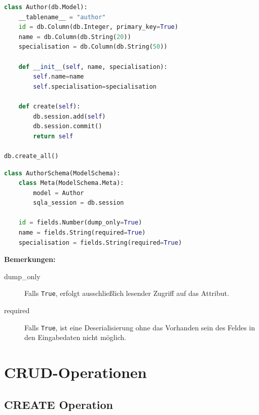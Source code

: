 \documentclass[a4paper,titlepage,halfparskip,12pt,listof=numbered]{scrreprt}
\begin{document}
\begin{lstlisting}[language=python,caption={Definition des Schemas für das SQLAlchemy Modul}, label={lst:tableSchemaAuthor}]
class Author(db.Model):
    __tablename__ = "author"
    id = db.Column(db.Integer, primary_key=True)
    name = db.Column(db.String(20))
    specialisation = db.Column(db.String(50))

    def __init__(self, name, specialisation):
        self.name=name
        self.specialisation=specialisation

    def create(self):
        db.session.add(self)
        db.session.commit()
        return self

db.create_all()

\end{lstlisting}

\bigskip

\begin{lstlisting}[language=python,caption={Definition des Schemas für das marshmallow Modul}, label={lst:marshmallowSchema}]
class AuthorSchema(ModelSchema):
    class Meta(ModelSchema.Meta):
        model = Author
        sqla_session = db.session

    id = fields.Number(dump_only=True)
    name = fields.String(required=True)
    specialisation = fields.String(required=True)
\end{lstlisting}

\textbf{Bemerkungen:}

\bigskip

\begin{description}
\item[dump\_only] Falls \texttt{True}, erfolgt ausschließlich lesender Zugriff auf das Attribut.\cite{marshmallowQuickstart}
\item[required] Falls \texttt{True}, ist eine Deserialisierung ohne das Vorhanden sein des Feldes in den Eingabedaten nicht möglich.\cite{marshmallowQuickstart}
\end{description}

\chapter{CRUD-Operationen}

\section{CREATE Operation}
\end{document}
